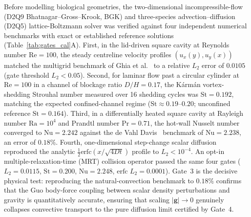 \documentclass[10pt,twocolumn,a4paper]{article}
\begin{document}
Before modelling biological geometries, the two-dimensional incompressible-flow (D2Q9 Bhatnagar--Gross--Krook, BGK) and three-species advection--diffusion (D2Q5) lattice-Boltzmann solver was verified against four independent numerical benchmarks with exact or established reference solutions (Table~\ref{tab:gates_cal}A). First, in the lid-driven square cavity at Reynolds number $\mathrm{Re} = 100$, the steady centreline velocity profiles $(u_x(y), u_y(x))$ matched the multigrid benchmark of Ghia et al.~\citep{ghia1982} to a relative $L_2$ error of $0.0105$ (gate threshold $L_2 < 0.05$). Second, for laminar flow past a circular cylinder at $\mathrm{Re} = 100$ in a channel of blockage ratio $D/H = 0.17$, the K\'arm\'an vortex-shedding Strouhal number measured over 16 shedding cycles was $\mathrm{St} = 0.192$, matching the expected confined-channel regime ($\mathrm{St}\approx 0.19\text{--}0.20$; unconfined reference $\mathrm{St} = 0.164$). Third, in a differentially heated square cavity at Rayleigh number $\mathrm{Ra} = 10^4$ and Prandtl number $\mathrm{Pr} = 0.71$, the hot-wall Nusselt number converged to $\mathrm{Nu} = 2.242$ against the de Vahl Davis~\citep{devahldavis1983} benchmark of $\mathrm{Nu} = 2.238$, an error of $0.18\%$. Fourth, one-dimensional step-change scalar diffusion reproduced the analytic $\tfrac{1}{2}\mathrm{erfc}(x/\sqrt{4Dt})$ profile to $L_2 < 10^{-4}$. An opt-in multiple-relaxation-time (MRT) collision operator \citep{lallemand2000} passed the same four gates ($L_2 = 0.0115$, $\mathrm{St} = 0.200$, $\mathrm{Nu} = 2.248$, $\mathrm{erfc}$ $L_2 = 0.0001$). Gate~3 is the decisive physical test: reproducing the natural-convection benchmark to $0.18\%$ confirms that the Guo body-force coupling \citep{guo2002} between scalar density perturbations and gravity is quantitatively accurate, ensuring that scaling $|\mathbf{g}|\to 0$ genuinely collapses convective transport to the pure diffusion limit certified by Gate~4.
\end{document}
